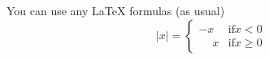 You can use any LaTeX formulas (as usual)
\begin{equation}
|x| = \begin{cases}
		-x & \text{if}  x < 0  \\
		 \phantom{-}x & \text{if} x\ge 0
      \end{cases}	
	  \end{equation}
